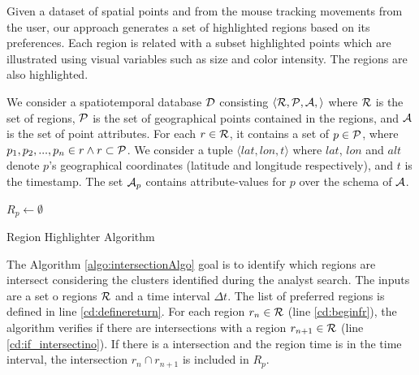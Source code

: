 \documentclass[runningheads,a4paper]{llncs}
\begin{document}
Given a dataset of spatial points and from the mouse tracking movements from the user, our approach generates a set of highlighted regions based on its preferences. Each region is related with a subset highlighted points which are illustrated using visual variables such as size and color intensity. The regions are also highlighted.

 We consider a spatiotemporal database ${\cal D}$ consisting $\langle {\cal R},  {\cal P}, {\cal A},  \rangle$ where ${\cal R}$ is the set of regions, ${\cal P}$ is the set of
geographical points contained in the regions, and ${\cal A}$ is the set of point attributes.  For each $r \in {\cal R}$,  it contains a set of $p \in {\cal P}$, where $p_1,p_2,...,p_n  \in r \land  r \subset	{\cal P}$. We consider a tuple $\langle lat, lon, t\rangle$ where $lat$, $lon$ and $alt$ denote $p$'s geographical coordinates (latitude and longitude  respectively), and $t$ is the timestamp. The set ${\cal A}_p$ contains attribute-values for $p$ over the schema of ${\cal A}$. 

\begin{algorithm}[t]
	\DontPrintSemicolon
	${ R_p} \gets \emptyset$\;\label{cd:definereturn}
	\; 
	\caption{{\sc Region Highlighter} Algorithm}
	\label{algo:intersectionAlgo}
\end{algorithm}

The Algorithm \ref{algo:intersectionAlgo} goal is to identify which regions are intersect considering the clusters identified during  the analyst search. The inputs are a set o regions ${\cal R}$  and a time interval $\Delta t$. The list of preferred regions is defined in line \ref{cd:definereturn}. For each region $r_n \in {\cal R}$ (line \ref{cd:beginfr}), the algorithm verifies if there are intersections with  a region $r_{n+1} \in {\cal R}$ (line \ref{cd:if_intersectino}). If there is a intersection and the region time is in the time interval, the intersection $r_n \cap r_{n+1} $ is included in ${ R_p}$.
\end{document}
